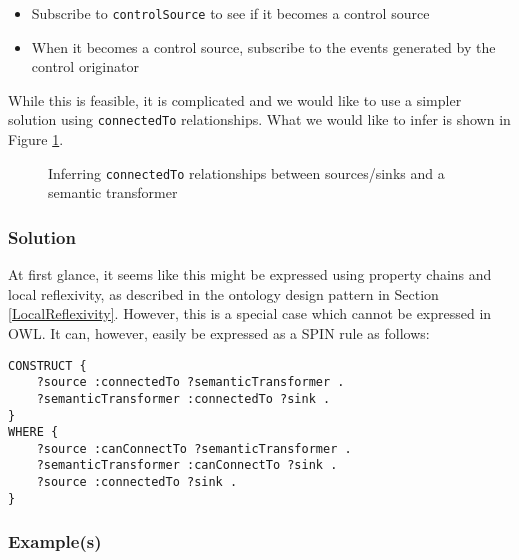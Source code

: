 \begin{itemize}
	\item Subscribe to \texttt{controlSource} to see if it becomes a control source
	\item When it becomes a control source, subscribe to the events generated by the control originator
\end{itemize}

While this is feasible, it is complicated and we would like to use a simpler solution using \texttt{connectedTo} relationships. What we would like to infer is shown in Figure \ref{semanticTransformerControl}.

\begin{figure}[bth] %
	\caption{Inferring \texttt{connectedTo} relationships between sources/sinks and a semantic transformer}
	\label{semanticTransformerControl}        
\end{figure}




\subsubsection{Solution}

At first glance, it seems like this might be expressed using property chains and local reflexivity, as described in the ontology design pattern in Section \ref{LocalReflexivity}. However, this is a special case which cannot be expressed in \ac{OWL}. It can, however, easily be expressed as a \ac{SPIN} rule as follows:

\begin{verbatim}
CONSTRUCT {
    ?source :connectedTo ?semanticTransformer .
    ?semanticTransformer :connectedTo ?sink .
}
WHERE {
    ?source :canConnectTo ?semanticTransformer .
    ?semanticTransformer :canConnectTo ?sink .
    ?source :connectedTo ?sink .
}
\end{verbatim}

\subsubsection{Example(s)}

